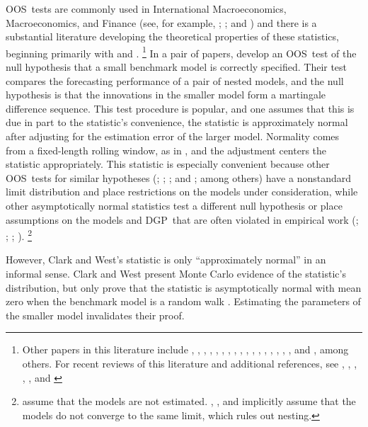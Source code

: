 \documentclass[12pt,fleqn]{article}
\theoremstyle{definition}
\newcommand{\dgp}{DGP}
\newcommand{\oos}{OOS}
\begin{document}
\oos\ tests are commonly used in International Macroeconomics,
Macroeconomics, and Finance (see, for example, \citealt{MeR:83};
\citealt{StW:03}; and \citealt{GoW:08}) and there is a substantial
literature developing the theoretical properties of these statistics,
beginning primarily with \citet{DiM:95} and
\citet{Wes:96}.%
\footnote{Other papers in this literature include
  \citet{WeM:98}, \citet{Mcc:98,Mcc:00},
  \citet{ClM:01,ClM:05-2,ClM:05,ClM:11b,ClM:12,ClM:12b},
  \citet{CCS:01}, \citet{CoS:02,CoS:04,CoS:07}, \citet{Whi:00},
  \citet{InK:04,InK:06}, \citet{Han:05}, \citet{Ros:05},
  \citet{ClW:06,ClW:07}, \citet{Ana:07}, \citet{GiR:09,GiR:10},
  \citet{HuW:10}, \citet{HLN:11}, \cite{InR:11}, \cite{Pin:11},
  \cite{RoS:11,RoS:11b}, and \citet{Cal:11}, among others.  For recent
  reviews of this literature and additional references, see
  \citet{McW:02}, \citet{CoS:06}, \citet{Wes:06}, \citet{ClM:11c},
  \citet{CoD:11}, and \citet{Gia:11}} %
In a pair of papers,
\citet{ClW:06,ClW:07} develop an \oos\ test of the null hypothesis
that a small benchmark model is correctly specified.  Their test
compares the forecasting performance of a pair of nested models, and
the null hypothesis is that the innovations in the smaller model form
a martingale difference sequence.  This test procedure is popular, and
one assumes that this is due in part to the statistic's convenience,
the statistic is approximately normal after adjusting for the
estimation error of the larger model.  Normality comes from a
fixed-length rolling window, as in \citet{GiW:06}, and the adjustment
centers the statistic appropriately.  This statistic is especially
convenient because other \oos\ tests for similar hypotheses
(\citealt{CCS:01}; \citealt{ClM:01,ClM:05}; \citealt{CoS:02,CoS:04};
and \citealt{Mcc:07}; among others) have a nonstandard limit
distribution and place restrictions on the models under consideration,
while other asymptotically normal statistics test a different null
hypothesis \citep{GiW:06} or place assumptions on the models and \dgp\
that are often violated in empirical work (\citealt{DiM:95};
\citealt{Wes:96}; \citealt{WeM:98};
\citealt{Mcc:00}).%
\footnote{\citet{DiM:95} assume that the models are
  not estimated. \citet{Wes:96}, \citet{WeM:98}, and \citet{Mcc:00}
  implicitly assume that the models do not converge to the same limit,
  which rules out nesting.} %

However, Clark and West's statistic is only ``approximately normal''
in an informal sense.  Clark and West present Monte Carlo evidence of
the statistic's distribution, but only prove that the statistic is
asymptotically normal with mean zero when the benchmark model is a
random walk \citep{ClW:06}. Estimating the parameters of the smaller
model invalidates their proof.
\end{document}
